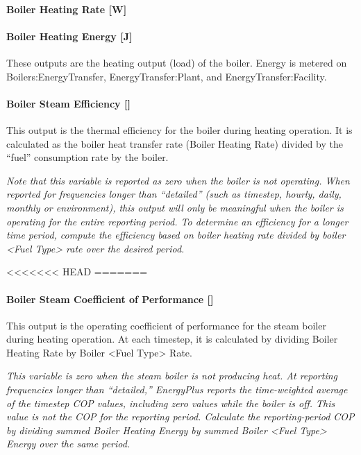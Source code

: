 \paragraph{Boiler Heating Rate {[}W{]}}\label{boiler-heating-rate-w-1}

\paragraph{Boiler Heating Energy {[}J{]}}\label{boiler-heating-energy-j-1}

These outputs are the heating output (load) of the boiler. Energy is metered on Boilers:EnergyTransfer, EnergyTransfer:Plant, and EnergyTransfer:Facility.

\paragraph{Boiler Steam Efficiency {[]}}\label{boiler-steam-efficiency}

This output is the thermal efficiency for the boiler during heating operation. It is calculated as the boiler heat transfer rate (Boiler Heating Rate) divided by the ``fuel'' consumption rate by the boiler.

\emph{Note that this variable is reported as zero when the boiler is not operating. When reported for frequencies longer than ``detailed'' (such as timestep, hourly, daily, monthly or environment), this output will only be meaningful when the boiler is operating for the entire reporting period. To determine an efficiency for a longer time period, compute the efficiency based on boiler heating rate divided by boiler \textless{}Fuel Type\textgreater{} rate over the desired period.}

<<<<<<< HEAD
=======
\paragraph{Boiler Steam Coefficient of Performance {[]}}\label{boiler-steam-coefficient-of-performance}

This output is the operating coefficient of performance for the steam boiler during heating operation. At each timestep, it is calculated by dividing Boiler Heating Rate by Boiler \textless{}Fuel Type\textgreater{} Rate.

\emph{This variable is zero when the steam boiler is not producing heat. At reporting frequencies longer than ``detailed,'' EnergyPlus reports the time-weighted average of the timestep COP values, including zero values while the boiler is off. This value is not the COP for the reporting period. Calculate the reporting-period COP by dividing summed Boiler Heating Energy by summed Boiler \textless{}Fuel Type\textgreater{} Energy over the same period.}

